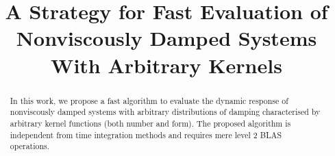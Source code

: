 \documentclass[3p,11pt,fleqn,review,sort&compress]{elsarticle}
\begin{document}
\linenumbers
\begin{abstract}
\begin{linenumbers}
In this work, we propose a fast algorithm to evaluate the dynamic response of nonviscously damped systems with arbitrary distributions of damping characterised by arbitrary kernel functions (both number and form). The proposed algorithm is independent from time integration methods and requires mere level 2 BLAS operations.
\end{linenumbers}
\end{abstract}
\begin{keyword}
\end{keyword}
\begin{frontmatter}
\title{A Strategy for Fast Evaluation of Nonviscously Damped Systems With Arbitrary Kernels}
\end{frontmatter}






\end{document}

